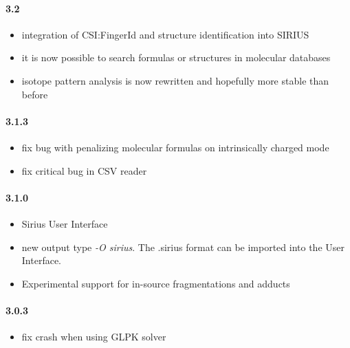 \paragraph{3.2}

\begin{itemize}

\item
  integration of CSI:FingerId and structure identification into SIRIUS
\item
  it is now possible to search formulas or structures in molecular
  databases
\item
  isotope pattern analysis is now rewritten and hopefully more stable
  than before
\end{itemize}

\paragraph{3.1.3}

\begin{itemize}

\item
  fix bug with penalizing molecular formulas on intrinsically charged
  mode
\item
  fix critical bug in CSV reader
\end{itemize}

\paragraph{3.1.0}

\begin{itemize}

\item
  Sirius User Interface
\item
  new output type \emph{-O sirius}. The .sirius format can be imported
  into the User Interface.
\item
  Experimental support for in-source fragmentations and adducts
\end{itemize}

\paragraph{3.0.3}

\begin{itemize}

\item
  fix crash when using GLPK solver
\end{itemize}

